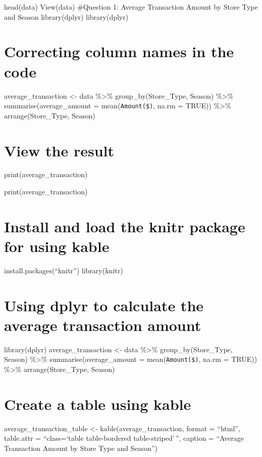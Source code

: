 \documentclass[
]{article}
\begin{document}
head(data) View(data) \#Question 1: Average Transaction Amount by Store
Type and Season library(dplyr) library(dplyr)

\section{Correcting column names in the
code}\label{correcting-column-names-in-the-code}

average\_transaction \textless- data \%\textgreater\%
group\_by(Store\_Type, Season) \%\textgreater\%
summarise(average\_amount = mean(\texttt{Amount(\$)}, na.rm = TRUE))
\%\textgreater\% arrange(Store\_Type, Season)

\section{View the result}\label{view-the-result}

print(average\_transaction)

print(average\_transaction)

\section{Install and load the knitr package for using
kable}\label{install-and-load-the-knitr-package-for-using-kable}

install.packages(``knitr'') library(knitr)

\section{Using dplyr to calculate the average transaction
amount}\label{using-dplyr-to-calculate-the-average-transaction-amount}

library(dplyr) average\_transaction \textless- data \%\textgreater\%
group\_by(Store\_Type, Season) \%\textgreater\%
summarise(average\_amount = mean(\texttt{Amount(\$)}, na.rm = TRUE))
\%\textgreater\% arrange(Store\_Type, Season)

\section{Create a table using kable}\label{create-a-table-using-kable}

average\_transaction\_table \textless- kable(average\_transaction,
format = ``html'', table.attr = ``class=`table table-bordered
table-striped'\,'', caption = ``Average Transaction Amount by Store Type
and Season'')
\end{document}

